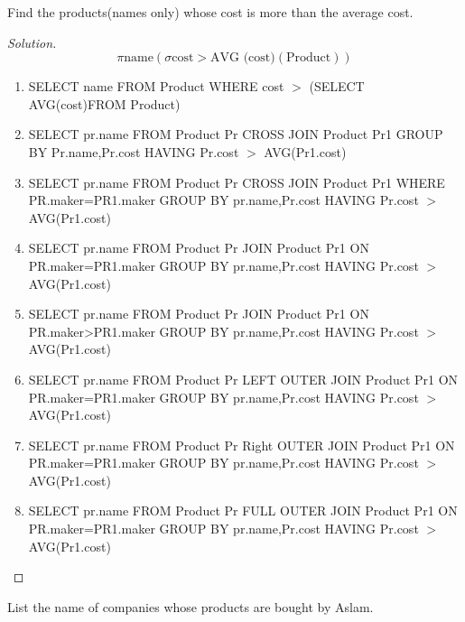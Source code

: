 \documentclass[10pt,a4paper]{article}
\newenvironment{problem}[2][Problem]{\begin{trivlist}
\item[\hskip \labelsep {\bfseries #1}\hskip \labelsep {\bfseries #2.}]}{\end{trivlist}}
\begin{document}
\begin{problem}{1}
Find the products(names only) whose cost is more than the average cost.
\end{problem}
\begin{proof}[Solution] 

\begin{equation*}
\pi \text{name} (\sigma \text{cost} > \text{AVG (cost)}  (\text{Product}))
\end{equation*}

\begin{enumerate}
    \item SELECT name FROM Product WHERE cost $>$ (SELECT AVG(cost)FROM Product)
    \item SELECT pr.name FROM Product Pr CROSS JOIN Product Pr1 GROUP BY Pr.name,Pr.cost HAVING Pr.cost $>$ AVG(Pr1.cost)
    \item SELECT pr.name FROM Product Pr CROSS JOIN Product Pr1 WHERE PR.maker=PR1.maker GROUP BY pr.name,Pr.cost HAVING Pr.cost $>$ AVG(Pr1.cost)

	\item SELECT pr.name FROM Product Pr JOIN Product Pr1 ON PR.maker=PR1.maker GROUP BY pr.name,Pr.cost HAVING Pr.cost $>$ AVG(Pr1.cost)
	\item SELECT pr.name FROM Product Pr JOIN Product Pr1 ON PR.maker>PR1.maker GROUP BY pr.name,Pr.cost HAVING Pr.cost $>$ AVG(Pr1.cost)
	\item SELECT pr.name FROM Product Pr LEFT OUTER JOIN Product Pr1
ON PR.maker=PR1.maker GROUP BY pr.name,Pr.cost HAVING Pr.cost $>$ AVG(Pr1.cost)
	\item SELECT pr.name FROM Product Pr Right OUTER JOIN Product Pr1
ON PR.maker=PR1.maker GROUP BY pr.name,Pr.cost HAVING Pr.cost $>$ AVG(Pr1.cost)
	\item SELECT pr.name FROM Product Pr FULL OUTER JOIN Product Pr1
ON PR.maker=PR1.maker GROUP BY pr.name,Pr.cost HAVING Pr.cost $>$ AVG(Pr1.cost)

\end{enumerate}
\end{proof}

\begin{problem}{2}
List the name of companies whose products are bought by Aslam.
\end{problem}
\end{document}
